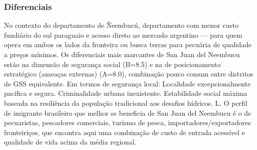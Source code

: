 \subsubsection*{Diferenciais}\label{dif-san-juan-del-neembucu-1212}
No contexto do departamento de Ñeembucú, departamento com menor custo fundiário do sul paraguaio e acesso direto ao mercado argentino — para quem opera em ambos os lados da fronteira ou busca terras para pecuária de qualidade a preços mínimos. Os diferenciais mais marcantes de San Juan del Neembucu estão na dimensão de segurança social (B=8.5) e na de posicionamento estratégico (ameaças externas) (A=8.0), combinação pouco comum entre distritos de GSS equivalente. Em termos de segurança local: Localidade excepcionalmente pacífica e segura. Criminalidade urbana inexistente. Estabilidade social máxima baseada na resiliência da população tradicional aos desafios hídricos. L. O perfil de imigrante brasileiro que melhor se beneficia de San Juan del Neembucu é o de pecuaristas, pescadores comerciais, turismo de pesca, importadores/exportadores fronteiriços, que encontra aqui uma combinação de custo de entrada acessível e qualidade de vida acima da média regional.
